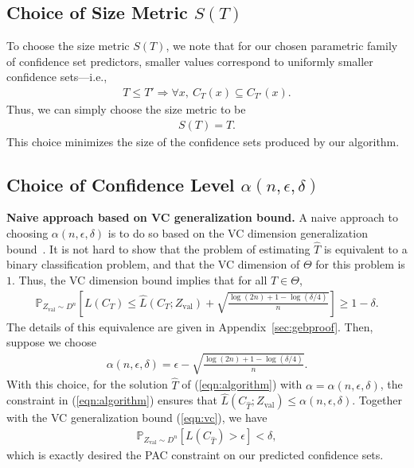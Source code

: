 \documentclass{article} \usepackage{iclr2020_conference,times}
\renewcommand{\(}						{\left(}
\renewcommand{\)}						{\right)}
\renewcommand{\[}						{\left[}
\renewcommand{\]}						{\right]}
\newcommand{\<}						{\left<}
\renewcommand{\>}						{\right>}
\begin{document}
\subsection{Choice of Size Metric $S(T)$}

To choose the size metric $S(T)$, we note that for our chosen parametric family of confidence set predictors, smaller values correspond to uniformly smaller confidence sets---i.e.,
\begin{align*}
T\le T'\Rightarrow \forall x,~C_T(x)\subseteq C_{T'}(x).
\end{align*}
Thus, we can simply choose the size metric to be
\begin{align}
S(T)=T.
\end{align}
This choice minimizes the size of the confidence sets produced by our algorithm.


\subsection{Choice of Confidence Level $\alpha(n,\epsilon,\delta)$}

\textbf{Naive approach based on VC generalization bound.}
A naive approach to choosing $\alpha(n,\epsilon,\delta)$ is to do so based on the VC dimension generalization bound~\citep{vapnik1999overview}. It is not hard to show that the problem of estimating $\hat{T}$ is equivalent to a binary classification problem, and that the VC dimension of $\Theta$ for this problem is $1$. Thus, the VC dimension bound implies that for all $T\in\Theta$,
\begin{align}
\label{eqn:vc}
\mathbb{P}_{Z_{\text{val}}\sim D^n}\left[L(C_T)\le\hat{L}(C_T;Z_{\text{val}})+\sqrt{\frac{\log(2n)+1-\log(\delta/4)}{n}}\right]\ge1-\delta.
\end{align}
The details of this equivalence are given in Appendix~\ref{sec:gebproof}. Then, suppose we choose
\begin{align*}
\alpha(n,\epsilon,\delta)=\epsilon-\sqrt{\frac{\log(2n)+1-\log(\delta/4)}{n}}.
\end{align*}
With this choice, for the solution $\hat{T}$ of (\ref{eqn:algorithm}) with $\alpha=\alpha(n,\epsilon,\delta)$, the constraint in (\ref{eqn:algorithm}) ensures that $\hat{L}(C_{\hat{T}};Z_{\text{val}})\le\alpha(n,\epsilon,\delta)$. Together with the VC generalization bound (\ref{eqn:vc}), we have
\begin{align*}
\mathbb{P}_{Z_{\text{val}}\sim D^n}\left[L(C_{\hat{T}})>\epsilon\right]<\delta,
\end{align*}
which is exactly desired the PAC constraint on our predicted confidence sets.
\end{document}
